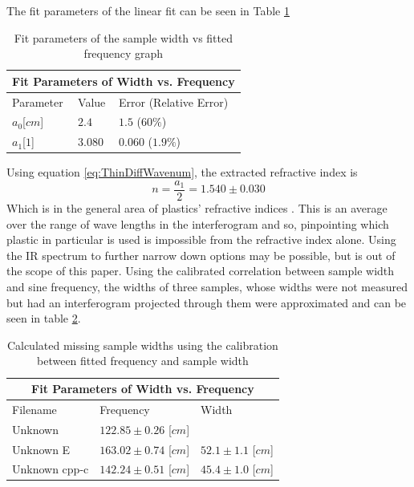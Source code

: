\documentclass[reprint,amsmath,amssymb,aps, prl]{revtex4-2}
\begin{document}
The fit parameters of the linear fit can be seen in Table \ref{tbl:WidthFit}
\begin{table}[h]
    \begin{tabular}{ |p{2cm}|p{2cm}|p{3.3cm}|  }
     \hline
     \multicolumn{3}{|c|}{Fit Parameters of Width vs. Frequency} \\ \hline
     Parameter & Value & Error (Relative Error)\\ \hline
     $a_{0}$[$cm$]  &$2.4$      &$1.5$ ($60\%$) \\ 
     $a_{1}$[$1$]   &$3.080$    &$0.060$ ($1.9\%$)  \\ \hline
    \end{tabular}
    \caption{Fit parameters of the sample width vs fitted frequency graph}
    \label{tbl:WidthFit}
\end{table}

Using equation \ref{eq:ThinDiffWavenum}, the extracted refractive index is
\begin{equation}
    n = \frac{a_1}{2} = 1.540 \pm 0.030
\end{equation}
Which is in the general area of plastics' refractive indices \cite{plasticRefract}. This is an average over the range of wave lengths in the interferogram and so, pinpointing which plastic in particular is used is impossible from the refractive index alone. Using the IR spectrum to further narrow down options may be possible, but is out of the scope of this paper.
Using the calibrated correlation between sample width and sine frequency, the widths of three samples, whose widths were not measured but had an interferogram projected through them were approximated and can be seen in table \ref{tbl:ThinMissingWidths}.
\begin{table}[h]
    \begin{tabular}{ |p{2.3cm}|p{3cm}|p{3cm}|  }
     \hline
     \multicolumn{3}{|c|}{Fit Parameters of Width vs. Frequency} \\ \hline
     Filename & Frequency & Width\\ \hline
     Unknown  &$122.85\pm0.26$ [$cm$]      &\\ 
     Unknown E &$163.02\pm0.74$ [$cm$]      &$52.1\pm1.1$ [$cm$]\\ 
     Unknown cpp-c&$142.24\pm0.51$ [$cm$]      &$45.4\pm1.0$ [$cm$]\\ \hline
    \end{tabular}
    \caption{Calculated missing sample widths using the calibration between fitted frequency and sample width}
    \label{tbl:ThinMissingWidths}
\end{table}
\end{document}
